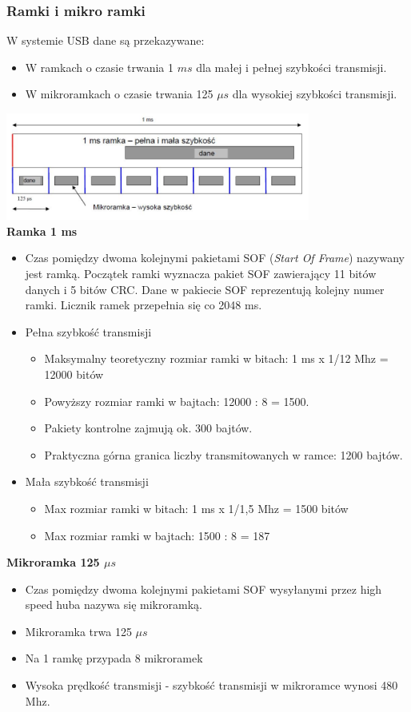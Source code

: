 		\subsubsection{Ramki i mikro ramki}
			W systemie USB dane są przekazywane:
			\begin{itemize}
				\item W ramkach o czasie trwania 1 $ms$ dla małej i pełnej szybkości transmisji.
				\item W mikroramkach o czasie trwania 125 $\mu s$ dla wysokiej szybkości transmisji.
			\end{itemize}
			\includegraphics[width=10cm]{./wyklady/USB_11_1.jpg}\\
			\textbf{Ramka 1 ms}
			\begin{itemize}
				\item Czas pomiędzy dwoma kolejnymi pakietami SOF (\emph{Start Of Frame}) nazywany jest ramką. Początek ramki wyznacza pakiet SOF zawierający 11 bitów danych i 5 bitów CRC. Dane w pakiecie SOF reprezentują kolejny numer ramki. Licznik ramek przepełnia się co 2048 ms.
				\item Pełna szybkość transmisji
				\begin{itemize}
					\item Maksymalny teoretyczny rozmiar ramki w bitach: 1 ms x 1/12 Mhz = 12000 bitów
					\item Powyższy rozmiar ramki w bajtach: 12000 : 8 = 1500.
					\item Pakiety kontrolne zajmują ok. 300 bajtów.
					\item Praktyczna górna granica liczby transmitowanych w ramce: 1200 bajtów.
				\end{itemize}
				\item Mała szybkość transmisji
				\begin{itemize}
					\item Max rozmiar ramki w bitach: 1 ms x 1/1,5 Mhz = 1500 bitów
					\item Max rozmiar ramki w bajtach: 1500 : 8 = 187
				\end{itemize}
			\end{itemize}
			\newpage
			\textbf{Mikroramka 125 $\mu s$}
			\begin{itemize}
				\item Czas pomiędzy dwoma kolejnymi pakietami SOF wysyłanymi przez high speed huba nazywa się mikroramką.
				\item Mikroramka trwa 125 $\mu s$
				\item Na 1 ramkę przypada 8 mikroramek
				\item Wysoka prędkość transmisji - szybkość transmisji w mikroramce wynosi 480 Mhz.
			\end{itemize}
			
